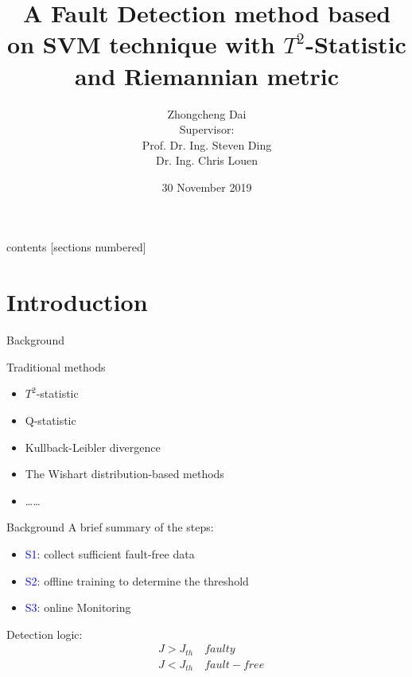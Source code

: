 \documentclass[10pt]{beamer}
\title{A Fault Detection method based on SVM technique with $T^2$-Statistic and Riemannian metric}
\author{Zhongcheng Dai  \\
 Supervisor: \\
 Prof. Dr. Ing. Steven Ding\\
Dr. Ing. Chris Louen 
}
\date{30 November 2019}
\institute{Automatic Control and Complex Systems}
\begin{document}
\maketitle
\begin{frame}{contents}
  [sections numbered]
  \tableofcontents[hideallsubsections]
\end{frame}
\section{Introduction}
\begin{frame}{Background}
    \begin{exampleblock}{Traditional methods}
	\begin{itemize}
    \item $T^2$-statistic
    \item Q-statistic
    \item Kullback-Leibler divergence
    \item The Wishart distribution-based methods
    \item \dots \dots
    \end{itemize}
    \end{exampleblock}
\end{frame}
\begin{frame}{Background}
 A brief summary of the steps:
      \begin{itemize}
      \item \textcolor{blue}{S1}: collect sufficient fault-free data
      \item \textcolor{blue}{S2}: offline training to determine the threshold
      \item \textcolor{blue}{S3}: online Monitoring  %
 	 \end{itemize}  
 Detection logic:
 \begin{equation}\nonumber
 \begin{aligned}
     &J > J_{th} \quad faulty \\
     &J < J_{th} \quad fault-free \\
     \end{aligned}
 \end{equation}
\end{frame}
\end{document}
